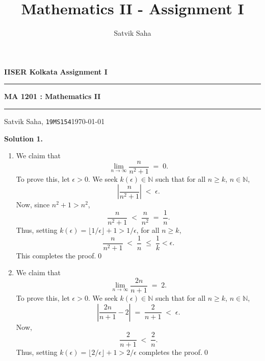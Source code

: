 \documentclass[10pt]{article}
\title{Mathematics II - Assignment I}
\author{Satvik Saha}
\date{}
\begin{document}
        \par\textbf{IISER Kolkata} \hfill \textbf{Assignment I}
        \vspace{3pt}
        \hrule
        \vspace{3pt}
        \begin{center}
                \LARGE{\textbf{MA 1201 : Mathematics II}}
        \end{center}
        \vspace{3pt}
        \hrule
        \vspace{3pt}
        Satvik Saha, \texttt{19MS154}\hfill\today
        \vspace{20pt}

        \textbf{Solution 1.}
        \begin{enumerate}
                \item We claim that
                        \[
                        \lim_{n\to \infty} \frac{n}{n^2 + 1} \;=\; 0.
                        \]
                        To prove this, let $\epsilon > 0$. We seek $k(\epsilon) \in \mathbb{N}$ such that for all $n \ge k$, $n \in \mathbb{N}$,
                        \[
                        \left| \frac{n}{n^2 + 1}\right| \;<\; \epsilon.
                        \]
                        Now, since $n^2 + 1 > n^2$,
                        \[
                        \frac{n}{n^2 + 1} \;<\; \frac{n}{n^2} \;=\; \frac{1}{n}.
                        \]
                        Thus, setting $k(\epsilon) = \lfloor 1 /\epsilon\rfloor + 1 > 1 /\epsilon$, for all $n \ge k$,
                        \[
                        \frac{n}{n^2 + 1} \;<\; \frac{1}{n}  \;\le\; \frac{1}{k} < \epsilon.
                        \]
                        This completes the proof.\qed\\
                \item We claim that
                        \[
                        \lim_{n\to \infty} \frac{2n}{n + 1} \;=\; 2.
                        \]
                        To prove this, let $\epsilon > 0$. We seek $k(\epsilon) \in \mathbb{N}$ such that for all $n \ge k$, $n \in \mathbb{N}$,
                        \[
                        \left| \frac{2n}{n + 1} - 2\right| \;=\; \frac{2}{n + 1} \;<\; \epsilon.
                        \]
                        Now,
                        \[
                        \frac{2}{n + 1} \;<\; \frac{2}{n}.
                        \]
                        Thus, setting $k(\epsilon) = \lfloor 2 /\epsilon\rfloor + 1 > 2 /\epsilon$ completes the proof.\qed\\

\end{enumerate}
\end{document}
